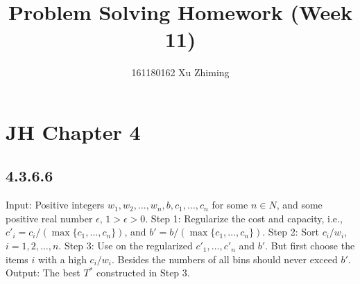 \documentclass{article}
\begin{document}
	\title{Problem Solving Homework (Week 11)}\author{161180162 Xu Zhiming}\maketitle
	\section*{JH Chapter 4}
	\subsection*{4.3.6.6}
	\begin{codebox}
		\zi{}\zi 
		Input: 	Positive integers $w_1,w_2,\dots,w_n,b,c_1,\dots,c_n$ for some $n\in N$, and some positive real number $\epsilon$, $1>\epsilon>0$.\zi 
		Step 1: Regularize the cost and capacity, i.e., $c'_i=c_i/(\max\{c_1,\dots, c_n\})$, and $b'=b/(\max\{c_1,\dots,c_n\})$.\zi 
		Step 2:	Sort $c_i/w_i$, $i=1,2,\dots,n$.
		Step 3: Use  on the regularized $c'_1,\dots, c'_n$ and $b'$. \zi But first choose the items $i$ with a high $c_i/w_i$. Besides the numbers of all bins should never exceed $b'$.\zi
		Output: The best $T^*$ constructed in Step 3.
	\end{codebox}
\end{document}
